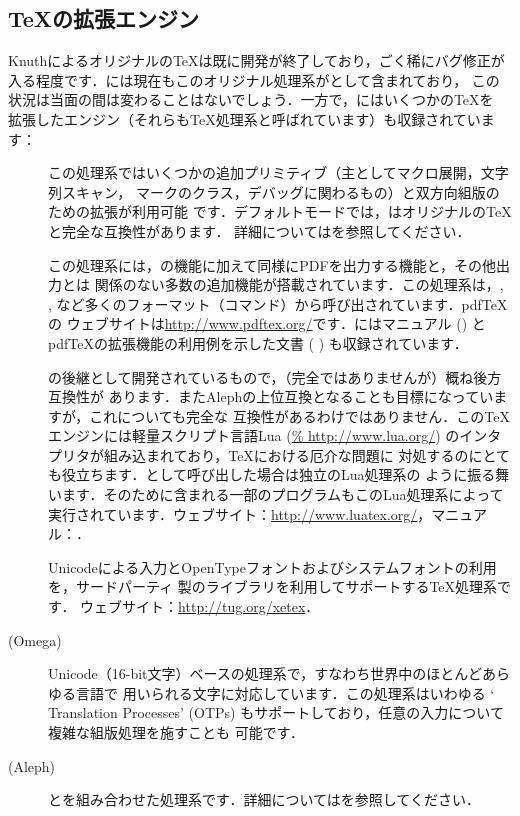 \documentclass[uplatex,dvipdfmx]{jsarticle}
\begin{document}
\subsection{\TeX の拡張エンジン}
\label{sec:tex-extensions}

Knuthによるオリジナルの\TeX は既に開発が終了しており，ごく稀にバグ修正が
入る程度です．\TL には現在もこのオリジナル処理系がとして含まれており，
この状況は当面の間は変わることはないでしょう．一方で，\TL にはいくつかの\TeX を
拡張したエンジン（それらも\TeX 処理系と呼ばれています）も収録されています：
%
\begin{description}
\item[\eTeX]
この処理系ではいくつかの追加プリミティブ（主としてマクロ展開，文字列スキャン，
マークのクラス，デバッグに関わるもの）と双方向組版のための\TeXXeT 拡張が利用可能
です．デフォルトモードでは，\eTeX はオリジナルの\TeX と完全な互換性があります．
詳細についてはを参照してください．

\item[\pdfTeX]
この処理系には，\eTeX の機能に加えて\DVI 同様にPDFを出力する機能と，その他出力とは
関係のない多数の追加機能が搭載されています．この処理系は，, ,
など多くのフォーマット（コマンド）から呼び出されています．pdf\TeX の
ウェブサイトは\url{http://www.pdftex.org/}です．\TL にはマニュアル () とpdf\TeX の拡張機能の利用例を示した文書 (%
) も収録されています．

\item[\LuaTeX]
\pdfTeX の後継として開発されているもので，（完全ではありませんが）概ね後方互換性が
あります．またAlephの上位互換となることも目標になっていますが，これについても完全な
互換性があるわけではありません．この\TeX エンジンには軽量スクリプト言語Lua (\url{%
http://www.lua.org/}) のインタプリタが組み込まれており，\TeX における厄介な問題に
対処するのにとても役立ちます．として呼び出した場合は独立のLua処理系の
ように振る舞います．そのため\TL に含まれる一部のプログラムもこのLua処理系によって
実行されています．ウェブサイト：\url{http://www.luatex.org/}，マニュアル：．

\item[\XeTeX]
Unicodeによる入力とOpenTypeフォントおよびシステムフォントの利用を，サードパーティ
製のライブラリを利用してサポートする\TeX 処理系です．
ウェブサイト：\url{http://tug.org/xetex}．

\item[{\OMEGA} (Omega)]
Unicode（16-bit文字）ベースの処理系で，すなわち世界中のほとんどあらゆる言語で
用いられる文字に対応しています．この処理系はいわゆる `\OMEGA{} Translation
Processes' (OTPs) もサポートしており，任意の入力について複雑な組版処理を施すことも
可能です．

\item[{\ALEPH} (Aleph)]
\OMEGA と\eTeX を組み合わせた処理系です．詳細についてはを参照してください．
\end{description}
\end{document}
